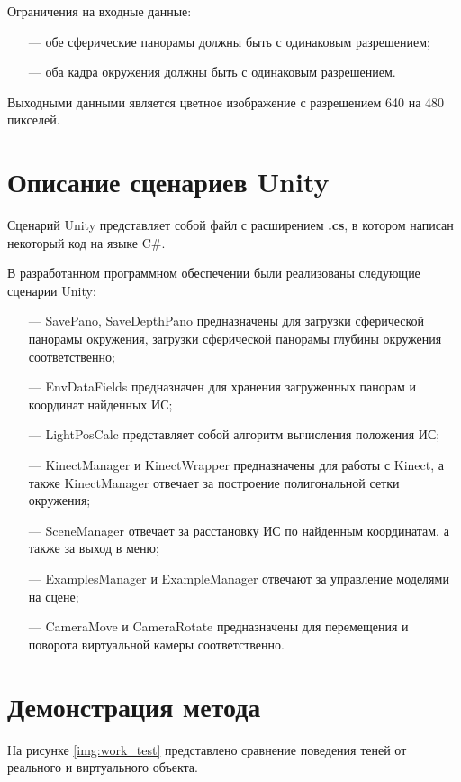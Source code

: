 Ограничения на входные данные:

\begin{itemize}
	\item[---] обе сферические панорамы должны быть с одинаковым разрешением;
	\item[---] оба кадра окружения должны быть с одинаковым разрешением.
\end{itemize}

Выходными данными является цветное изображение с разрешением 640 на 480 пикселей.

\section{Описание сценариев Unity}

Сценарий Unity представляет собой файл с расширением \textbf{.cs}, в котором написан некоторый код на языке C\#.

В разработанном программном обеспечении были реализованы следующие сценарии Unity:

\begin{itemize}
	\item[---] SavePano, SaveDepthPano предназначены для загрузки сферической панорамы окружения, загрузки сферической панорамы глубины окружения соответственно;
	\item[---] EnvDataFields предназначен для хранения загруженных панорам и координат найденных ИС;
	\item[---] LightPosCalc представляет собой алгоритм вычисления положения ИС;
	\item[---] KinectManager и KinectWrapper предназначены для работы с Kinect, а также KinectManager отвечает за построение полигональной сетки окружения;
	\item[---] SceneManager отвечает за расстановку ИС по найденным координатам, а также за выход в меню;
	\item[---] ExamplesManager и ExampleManager отвечают за управление моделями на сцене;
	\item[---] CameraMove и CameraRotate предназначены для перемещения и поворота виртуальной камеры соответственно.
\end{itemize}

\section{Демонстрация метода}

На рисунке \ref{img:work_test} представлено сравнение поведения теней от реального и виртуального объекта.

